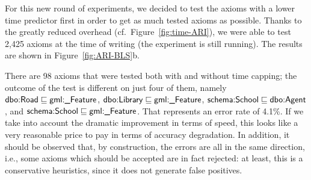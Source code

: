 \documentclass{llncs}
\begin{document}
%
%


For this new round of experiments, we decided to test the axioms with a lower
time predictor first in order to get as much tested axioms as possible.
Thanks to the greatly reduced overhead (cf.\ Figure~\ref{fig:time-ARI}),
we were able to test 2,425 axioms at the time
of writing (the experiment is still running).
The results are shown in Figure~\ref{fig:ARI-BLS}b.

There are 98 axioms that were tested both with and without time capping;
the outcome of the test is different on just four of them,
namely
$\mbox{\textsf{dbo:Road}} \sqsubseteq \mbox{\textsf{gml:\_Feature}}$,
$\mbox{\textsf{dbo:Library}} \sqsubseteq \mbox{\textsf{gml:\_Feature}}$,
$\mbox{\textsf{schema:School}} \sqsubseteq \mbox{\textsf{dbo:Agent}}$, and\break
$\mbox{\textsf{schema:School}} \sqsubseteq \mbox{\textsf{gml:\_Feature}}$.
That represents an error rate of 4.1\%. If we take into account the dramatic
improvement in terms of speed, this looks like a very reasonable price to pay
in terms of accuracy degradation. In addition, it should be observed that,
by construction, the errors are all in the same direction, i.e., some axioms
which should be accepted are in fact rejected: at least, this is a conservative
heuristics, since it does not generate false positives.
\end{document}
